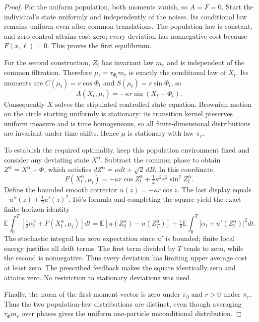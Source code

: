 \documentclass[11pt,a4paper]{article}
\theoremstyle{remark}
\newcommand{\E}{\mathbb E}
\begin{document}
\begin{proof}
For the uniform population, both moments vanish, so $A=F=0$. Start the individual's state uniformly and independently of the noises. Its conditional law remains uniform even after common translations. The population law is constant, and zero control attains cost zero; every deviation has nonnegative cost because $F(x,\ell)=0$. This proves the first equilibrium.

For the second construction, $Z_t$ has invariant law $m_r$ and is independent of the common filtration. Therefore $\mu_t=\tau_{\Phi_t}m_r$ is exactly the conditional law of $X_t$. Its moments are $C(\mu_t)=r\cos\Phi_t$ and $S(\mu_t)=r\sin\Phi_t$, so
\[
 A(X_t,\mu_t)=-\kappa r\sin(X_t-\Phi_t).
\]
Consequently $X$ solves the stipulated controlled state equation. Brownian motion on the circle starting uniformly is stationary: its transition kernel preserves uniform measure and is time homogeneous, so all finite-dimensional distributions are invariant under time shifts. Hence $\mu$ is stationary with law $\pi_r$.

To establish the required optimality, keep this population environment fixed and consider any deviating state $X^\alpha$. Subtract the common phase to obtain $Z^\alpha=X^\alpha-\Phi$, which satisfies $dZ^\alpha=\alpha dt+\sqrt2\,dB$. In this coordinate,
\[
 F(X^\alpha_t,\mu_t)=-\kappa r\cos Z^\alpha_t
                  +\tfrac12\kappa^2r^2\sin^2 Z^\alpha_t.
\]
Define the bounded smooth corrector $u(z)=-\kappa r\cos z$. The last display equals $-u''(z)+\tfrac12 u'(z)^2$. It\^o's formula and completing the square yield the exact finite-horizon identity
\[
 \E\int_0^T\left[\tfrac12\alpha_t^2+F(X^\alpha_t,\mu_t)\right]dt
 =\E[u(Z^\alpha_0)-u(Z^\alpha_T)]
 +\tfrac12\E\int_0^T|\alpha_t+u'(Z^\alpha_t)|^2dt. \tag{2}
\]
The stochastic integral has zero expectation since $u'$ is bounded; finite local energy justifies all drift terms. The first term divided by $T$ tends to zero, while the second is nonnegative. Thus every deviation has limiting upper average cost at least zero. The prescribed feedback makes the square identically zero and attains zero. No restriction to stationary deviations was used.

Finally, the norm of the first-moment vector is zero under $\pi_0$ and $r>0$ under $\pi_r$. Thus the two population-law distributions are distinct, even though averaging $\tau_\Phi m_r$ over phases gives the uniform one-particle unconditional distribution.
\end{proof}
\end{document}
